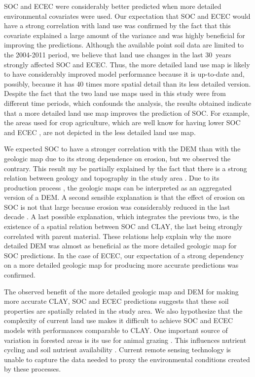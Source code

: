 SOC and ECEC were considerably better predicted when more detailed environmental
covariates were used. Our expectation that SOC and ECEC would have a strong 
correlation with land use was confirmed by the fact that this covariate 
explained a large amount of the variance and was highly beneficial for improving
the predictions. Although the available point soil data are limited to the 
2004-2011 period, we believe that land use changes in the last 30~years 
\citep{MiguelEtAl2012, TenCatenEtAl2012b} strongly affected SOC and ECEC. Thus, 
the more detailed land use map is likely to have considerably improved model 
performance because it is up-to-date and, possibly, because it has 40 times 
more spatial detail than its less detailed version. Despite the fact that the 
two land use maps used in this study were from different time periods, which 
confounds the analysis, the results obtained indicate that a more detailed land 
use map improves the prediction of SOC. For example, the areas used for crop 
agriculture, which are well know for having lower SOC and ECEC 
\citep{Menezes2008, MouraBueno2012}, are not depicted in the less detailed land 
use map.

We expected SOC to have a stronger correlation with the DEM than with the 
geologic map due to its strong dependence on erosion, but we observed the 
contrary. This result my be partially explained by the fact that there is a 
strong relation between geology and topography in the study area 
\citep{Sartori2009}. Due to its production process \citep{MacielFilho1990}, 
the geologic maps can be interpreted as an aggregated version of a DEM. A 
second sensible explanation is that the effect of erosion on SOC is not that 
large because erosion was considerably reduced in the last decade 
\citep{MiguelEtAl2012, TenCatenEtAl2012b}. A last possible explanation, which 
integrates the previous two, is the existence of a spatial relation between SOC
and CLAY, the last being strongly correlated with parent material. These 
relations help explain why the more detailed DEM was almost as beneficial as 
the more detailed geologic map for SOC predictions. In the case of ECEC, our 
expectation of a strong dependency on a more detailed geologic map for 
producing more accurate predictions was confirmed.

The observed benefit of the more detailed geologic map and DEM for making more 
accurate CLAY, SOC and ECEC predictions suggests that these soil properties are
spatially related in the study area. We also hypothesize that the complexity of
current land use makes it difficult to achieve SOC and ECEC models with 
performances comparable to CLAY. One important source of variation in 
forested areas is its use for animal grazing \citep{SamuelRosaEtAl2011a}. 
This influences nutrient cycling and soil nutrient availability 
\citep{SchramaEtAl2013}. Current remote sensing technology is unable to 
capture the data needed to proxy the environmental conditions created by
these processes.

